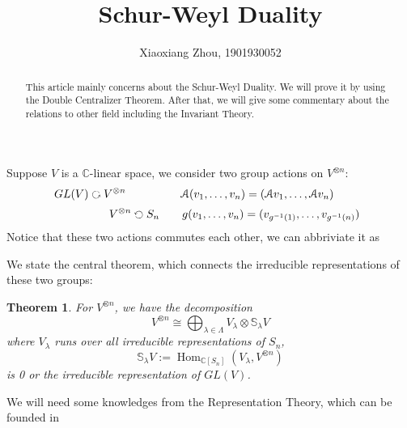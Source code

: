 \documentclass[11pt,oneside]{amsart}
\numberwithin{equation}{section}
\theoremstyle{plain}
\newtheorem{theorem}{Theorem}[section]
\theoremstyle{plain}
\numberwithin{equation}{section}
\theoremstyle{remark}
\newcommand{\elli}{,\ldots,}
\newcommand{\Hom}{\operatorname{Hom}}
\newcommand{\End}{\operatorname{End}}
\begin{document}
	\date{}
	
	\title
	{Schur-Weyl Duality}
	
	
\author{Xiaoxiang Zhou, 1901930052}
\address{School of Mathematical Sciences\\
University of Science and Technology of China\\
Hefei, 230026\\ P.R. China\\} 

	
	
	
	
	
	\begin{abstract}
		This article mainly concerns about the Schur-Weyl Duality. We will prove it by using the Double Centralizer Theorem. After that, we will give some commentary about the relations to other field including the Invariant Theory.
		
	\end{abstract}
	
	
	
	\maketitle
			Suppose $V$ is a $\mathbb{C}$-linear space, we consider two group actions on $V^{\otimes n}$:
	$$\hspace{-1cm}GL(V) \text{ \rotatebox[origin=c]{270}{$\circlearrowleft$} } V^{\otimes n} \qquad \hspace{1cm} \mathcal{A}(v_1\elli v_n) =(\mathcal{A}v_1\elli \mathcal{A}v_n)$$
	$$\hspace{1.5cm}V^{\otimes n}\text{ \rotatebox[origin=c]{90}{$\circlearrowleft$} }S_n\qquad g(v_1\elli v_n) =(v_{g^{-1}(1)}\elli v_{g^{-1}(n)})$$
	Notice that these two actions commutes each other, we can abbriviate it as
	\begin{center}
	\end{center}

	
	We state the central theorem, which connects the irreducible representations of these two groups:
	\begin{theorem}
		For $V^{\otimes n}$, we have the decomposition
		$$V^{\otimes n} \cong \bigoplus_{\lambda \in \Lambda} V_{\lambda} \otimes \mathbb{S}_{\lambda}V$$
		where $V_{\lambda}$ runs over all irreducible representations of $S_n$, 
		$$\mathbb{S}_{\lambda}V:=\Hom_{\mathbb{C}[S_n]}(V_{\lambda},V^{\otimes n}) $$
		is 0 or the irreducible representation of $GL(V)$.
	\end{theorem}
	We will need some knowledges from the Representation Theory, which can be founded in \cite{alperin2012groups}
	
\end{document}
